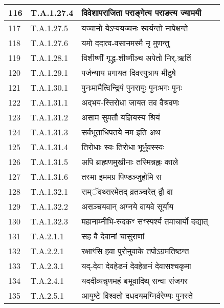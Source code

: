 \documentclass[17pt]{extarticle}
\begin{document}
\begin{longtable}{||p{0.4in}||p{0.9in}||p{4.0in}||p{0.9in}||}
        \hline
            116 & T.A.1.27.4 & विवेशापराजिता पराङ्गेत्य पराङत्य ज्यामयी &      \\
        \hline
            117 & T.A.1.27.5 & यज्वानो येऽप्ययज्वनः स्वर्यन्तो नापेक्षन्ते &      \\
        \hline
            118 & T.A.1.27.6 & यमो ददात्व{-}वसानमस्मै नृ मुणन्तु &      \\
        \hline
            119 & T.A.1.28.1 & विशीर्ष्णीं गृद्ध्र{-}शीर्ष्णीञ्च अपेतो निर्.ऋतिं &      \\
        \hline
            120 & T.A.1.29.1 & पर्जन्याय प्रगायत दिवस्पुत्राय मीढुषे &      \\
        \hline
            121 & T.A.1.30.1 & पुनःमामैत्विन्द्रियं पुनरायुः पुनःभगः पुनः &      \\
        \hline
            122 & T.A.1.31.1 & अद्भय{-}स्तिरोधा जायत तव वैश्रवणः &      \\
        \hline
            123 & T.A.1.31.2 & असाम सुमतौ यज्ञियस्य श्रियं &      \\
        \hline
            124 & T.A.1.31.3 & सर्वभूताधिपतये नम इति अथ &      \\
        \hline
            125 & T.A.1.31.4 & तिरोधाः स्वः तिरोधा भूर्भुवस्स्वः &      \\
        \hline
            126 & T.A.1.31.5 & अपि ब्राह्मणमुखीनाः तस्मिन्नह्नः काले &      \\
        \hline
            127 & T.A.1.31.6 & तस्मा इममग्र पिण्डञ्जुहोमि स &      \\
        \hline
            128 & T.A.1.32.1 & सम्ॅवथ्सरमेतद् व्रतञ्चरेत् द्वौ वा &      \\
        \hline
            129 & T.A.1.32.2 & असञ्चयवान् अग्नये वायवे सूर्याय &      \\
        \hline
            130 & T.A.1.32.3 & महानाम्नीभि{-}रुदकꣳ सꣳस्पर्श्य तमाचार्यो दद्यात् &      \\
        \hline
            131 & T.A.2.1.1 & सह वै देवानां चासुराणां &      \\
        \hline
            132 & T.A.2.2.1 & रक्षाꣳसि हवा पुरोनुवाके तपोऽग्रमतिष्ठन्त &      \\
        \hline
            133 & T.A.2.3.1 & यद्{-}देवा देवहेडनं देवहेळनं देवासश्चकृमा &      \\
        \hline
            134 & T.A.2.4.1 & यददीव्यन्नृणमहं बभूवादिथ् सन्वा संजगर &      \\
        \hline
            135 & T.A.2.5.1 & आयुष्टे विश्वतो दधदयमग्निर्वरेण्यः पुनस्ते &      \\

\end{longtable}
\end{document}
